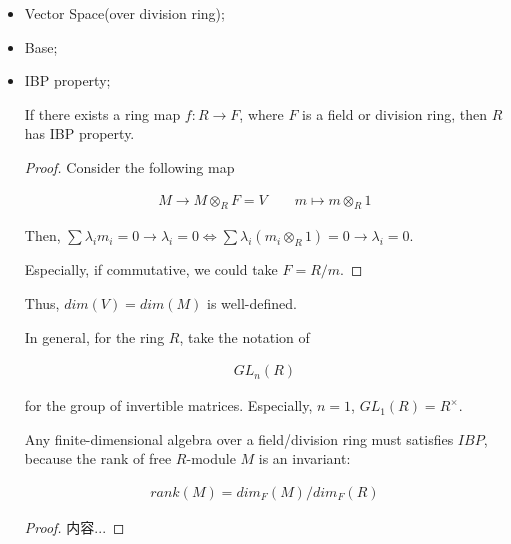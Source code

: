 \documentclass[Total.tex]{subfiles}
\begin{document}
	\begin{itemize}
		\item Vector Space(over division ring);
		
		\item Base;
		
		\item IBP property;
		
		\begin{lemma}
			If there exists a ring map $f:R\rightarrow F$, where $F$ is a field or division ring, then $R$ has IBP property.
		\end{lemma}
		
		\begin{proof}
			Consider the following map
			
			\begin{gather*}
				M\rightarrow M\otimes_R F=V\qquad m\mapsto m\otimes_R 1
			\end{gather*}
			
			Then, $\sum \lambda_i m_i=0\rightarrow \lambda_i=0\Leftrightarrow \sum \lambda_i (m_i\otimes_R 1)=0\rightarrow \lambda_i=0$.
			
			Especially, if commutative, we could take $F=R/m$.
		\end{proof}
		
		Thus, $dim(V)=dim(M)$ is well-defined.
		
		\begin{Def}
			In general, for the ring $R$, take the notation of 
			
			\begin{gather*}
				GL_n(R)
			\end{gather*}
			
			for the group of invertible matrices. Especially, $n=1$, $GL_1(R)=R^\times$.
		\end{Def}
		
		\begin{lemma}
			Any finite-dimensional algebra over a field/division ring must satisfies $IBP$, because the rank of free $R$-module $M$ is an invariant:
			
			\begin{gather*}
				rank(M)=dim_F(M)/dim_F(R)
			\end{gather*}
		\end{lemma}
		
		\begin{proof}
			内容...
		\end{proof}
		
	\end{itemize}
	
\end{document}
